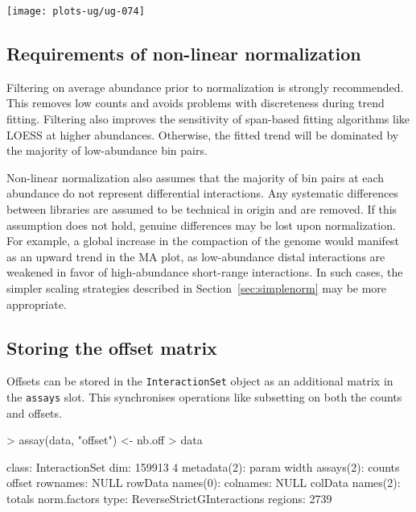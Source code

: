 \documentclass[12pt]{report}
\renewenvironment{Schunk}{\vspace{0pt}}{\vspace{0pt}}
\newcommand{\code}[1]{{\small\texttt{#1}}}
\begin{document}
\begin{center}
\texttt{[image: plots-ug/ug-074]}
\end{center}

\subsection{Requirements of non-linear normalization}
Filtering on average abundance prior to normalization is strongly recommended.
This removes low counts and avoids problems with discreteness during trend fitting.
Filtering also improves the sensitivity of span-based fitting algorithms like LOESS at higher abundances.
Otherwise, the fitted trend will be dominated by the majority of low-abundance bin pairs.

Non-linear normalization also assumes that the majority of bin pairs at each abundance do not represent differential interactions.
Any systematic differences between libraries are assumed to be technical in origin and are removed.
If this assumption does not hold, genuine differences may be lost upon normalization.
For example, a global increase in the compaction of the genome would manifest as an upward trend in the MA plot, as low-abundance distal interactions are weakened in favor of high-abundance short-range interactions.
In such cases, the simpler scaling strategies described in Section~\ref{sec:simplenorm} may be more appropriate.

\subsection{Storing the offset matrix}
Offsets can be stored in the \code{InteractionSet} object as an additional matrix in the \code{assays} slot.
This synchronises operations like subsetting on both the counts and offsets.

\begin{Schunk}
\begin{Sinput}
> assay(data, "offset") <- nb.off
> data
\end{Sinput}
\begin{Soutput}
class: InteractionSet 
dim: 159913 4 
metadata(2): param width
assays(2): counts offset
rownames: NULL
rowData names(0):
colnames: NULL
colData names(2): totals norm.factors
type: ReverseStrictGInteractions
regions: 2739
\end{Soutput}
\end{Schunk}
\end{document}
